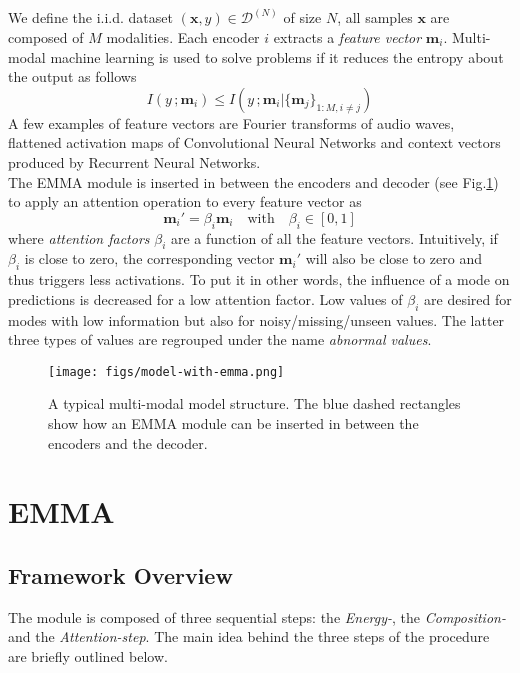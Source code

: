 \documentclass[12pt]{report}
\begin{document}
\indent We define the i.i.d. dataset $(\mathbf{x},y) \in \mathcal{D}^{(N)}$ of size $N$, all samples $\textbf{x}$ are composed of $M$ modalities. Each encoder $i$ extracts a \textit{feature vector} $\textbf{m}_i$. Multi-modal machine learning is used to solve problems if it reduces the entropy about the output as follows
\begin{equation}
I(y\,;\textbf{m}_i) \leq I(y\,;\textbf{m}_i|\{\textbf{m}_j\}_{1:M, i \neq j })
\end{equation}
A few examples of feature vectors are Fourier transforms of audio waves, flattened activation maps of Convolutional Neural Networks and context vectors produced by Recurrent Neural Networks.\\

\indent The EMMA module is inserted in between the encoders and decoder (see Fig.\ref{fig:model-with}) to apply an attention operation to every feature vector as
\begin{equation}
\textbf{m}_i' = \beta_i \textbf{m}_i \quad \text{with} \quad \beta_i \in [0,1]
\label{eq:masking}
\end{equation}
where \textit{attention factors} $\beta_i$ are a function of all the feature vectors. Intuitively, if $\beta_i$ is close to zero, the corresponding vector $\textbf{m}_i'$ will also be close to zero and thus triggers less activations. To put it in other words, the influence of a mode on predictions is decreased for a low attention factor. Low values of $\beta_i$ are desired for modes with low information but also for noisy/missing/unseen values. The latter three types of values are regrouped under the name \textit{abnormal values}. 

\begin{figure}[!ht]
    \centering
    \texttt{[image: figs/model-with-emma.png]}%
	\vspace{1mm}\caption{A typical multi-modal model structure. The blue dashed rectangles show how an EMMA module can be inserted in between the encoders and the decoder.}%
	\label{fig:model-with}
\end{figure}

\section{EMMA}\label{sec:emma}

\subsection{Framework Overview}
The module is composed of three sequential steps: the \textit{Energy-}, the \textit{Composition-} and the \textit{Attention-step}. The main idea behind the three steps of the procedure are briefly outlined below. \\
\end{document}
